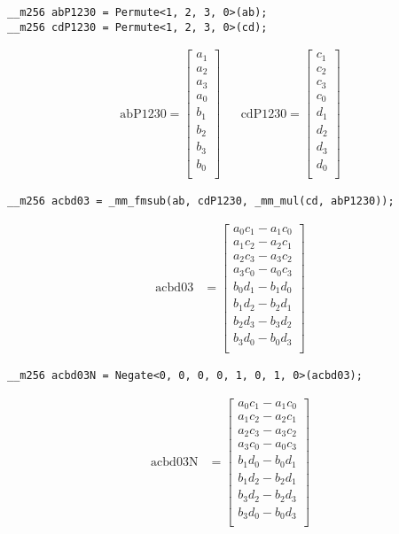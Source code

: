 \begin{verbatim}
__m256 abP1230 = Permute<1, 2, 3, 0>(ab);
__m256 cdP1230 = Permute<1, 2, 3, 0>(cd);
\end{verbatim}
\begin{align*}
\mathrm{abP1230} 
=
\begin{bmatrix}
a_1\\
a_2\\
a_3\\
a_0\\
b_1\\
b_2\\
b_3\\
b_0\\
\end{bmatrix}
&&
\mathrm{cdP1230} 
=
\begin{bmatrix}
c_1\\
c_2\\
c_3\\
c_0\\
d_1\\
d_2\\
d_3\\
d_0\\
\end{bmatrix}
\end{align*}



\begin{verbatim}
__m256 acbd03 = _mm_fmsub(ab, cdP1230, _mm_mul(cd, abP1230)); 
\end{verbatim}
\begin{align*}
\mathrm{acbd03} 
&=
\begin{bmatrix}
a_0c_1 - a_1c_0\\
a_1c_2 - a_2c_1\\
a_2c_3 - a_3c_2\\
a_3c_0 - a_0c_3\\
b_0d_1 - b_1d_0\\
b_1d_2 - b_2d_1\\
b_2d_3 - b_3d_2\\
b_3d_0 - b_0d_3\\
\end{bmatrix}
\end{align*}



\begin{verbatim}
__m256 acbd03N = Negate<0, 0, 0, 0, 1, 0, 1, 0>(acbd03);
\end{verbatim}
\begin{align*}
\mathrm{acbd03N} 
&=
\begin{bmatrix}
a_0c_1 - a_1c_0\\
a_1c_2 - a_2c_1\\
a_2c_3 - a_3c_2\\
a_3c_0 - a_0c_3\\
b_1d_0 - b_0d_1\\
b_1d_2 - b_2d_1\\
b_3d_2 - b_2d_3\\
b_3d_0 - b_0d_3\\
\end{bmatrix}
\end{align*}



